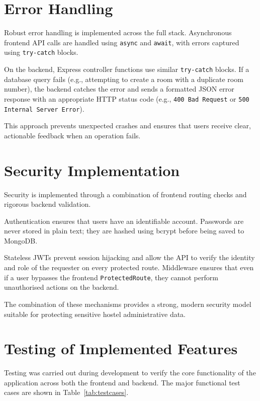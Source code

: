 \section{Error Handling}

Robust error handling is implemented across the full stack. Asynchronous frontend API calls are handled using \texttt{async} and \texttt{await}, with errors captured using \texttt{try-catch} blocks. 

On the backend, Express controller functions use similar \texttt{try-catch} blocks. If a database query fails (e.g., attempting to create a room with a duplicate room number), the backend catches the error and sends a formatted JSON error response with an appropriate HTTP status code (e.g., \texttt{400 Bad Request} or \texttt{500 Internal Server Error}).

This approach prevents unexpected crashes and ensures that users receive clear, actionable feedback when an operation fails.

\section{Security Implementation}

Security is implemented through a combination of frontend routing checks and rigorous backend validation.

Authentication ensures that users have an identifiable account. Passwords are never stored in plain text; they are hashed using bcrypt before being saved to MongoDB.

Stateless JWTs prevent session hijacking and allow the API to verify the identity and role of the requester on every protected route. Middleware ensures that even if a user bypasses the frontend \texttt{ProtectedRoute}, they cannot perform unauthorised actions on the backend.

The combination of these mechanisms provides a strong, modern security model suitable for protecting sensitive hostel administrative data.

\section{Testing of Implemented Features}

Testing was carried out during development to verify the core functionality of the application across both the frontend and backend. The major functional test cases are shown in Table~\ref{tab:testcases}.

